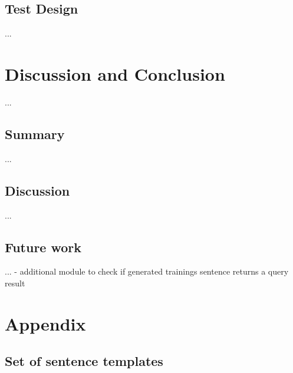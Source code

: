 \section{Test Design}\label{c.evaluation.test}
...

\chapter{Discussion and Conclusion}\label{c.conclusion}
...

\section{Summary}\label{c.conclusion.summary}
...

\section{Discussion}\label{c.conclusion.discussion}
...

\section{Future work}\label{c.conclusion.future}
...
- additional module to check if generated trainings sentence returns a query result


\cite{mueller2015}




\appendix
\chapter{Appendix}\label{c.appendix}

\section{Set of sentence templates}\label{c.appendix.sentencetemplates}


